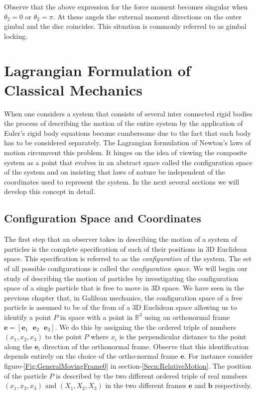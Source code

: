 \documentclass[graybox,envcountchap,sectrefs]{svmonoMuga}
\begin{document}
Observe that the above expression for the force moment becomes singular when $\theta_2=0$ or $\theta_2=\pi$. At these angels the external moment directions on the outer gimbal 
and the disc coincides. This situation is commonly referred to as gimbal locking.







\newpage
\chapter{Lagrangian Formulation of Classical Mechanics}
When one considers a system that consists of several inter connected rigid bodies the process of describing the motion of the entire system by the application of Euler's rigid body equations become cumbersome due to the fact that each body has to be considered separately. The Lagrangian formulation of Newton's laws of motion circumvent this problem. It hinges on the idea of viewing the composite system as a point that evolves in an abstract space called the {configuration space} of the system and on insisting that laws of nature be independent of the coordinates used to represent the system.
In the next several sections we will develop this concept in detail.

\section{Configuration Space and Coordinates}
The first step that an observer takes in describing the motion of a system of particles is the complete specification of each of their positions in 3D Euclidean space. This specification is referred to as the 
\textit{configuration} of the system. 
The set of all possible configurations is called the \textit{configuration space}. We will begin our study of describing the motion of particles by investigating the configuration space of a single particle that is free to move in 3D space. We have seen in the previous chapter that, in  Galilean mechanics, the configuration space of a free particle is assumed to be of the from of a 3D Euclidean space allowing us to identify a point $P$ in space with a point in $\mathbb{R}^3$ using an orthonormal frame $\mathbf{e}=[\mathbf{e}_1\:\:\:\mathbf{e}_2\:\:\:\mathbf{e}_3]$. We do this by assigning the the ordered triple of numbers $(x_1,x_2,x_3)$ to the point $P$ where $x_i$ is the perpendicular distance to the point along the $\mathbf{e}_i$ direction of the orthonormal frame.  
Observe that this identification depends entirely on the choice of the ortho-normal frame $\mathbf{e}$.
For instance consider figure-\ref{Fig:GeneralMovingFrame0} in section-\ref{Secn:RelativeMotion}. The position of the particle $P$ is described by the two different ordered triple of real numbers $(x_1,x_2,x_3)$ and $
(X_1,X_2,X_3)$ in the two different frames $\mathbf{e}$ and $\mathbf{b}$ respectively.
\end{document}
